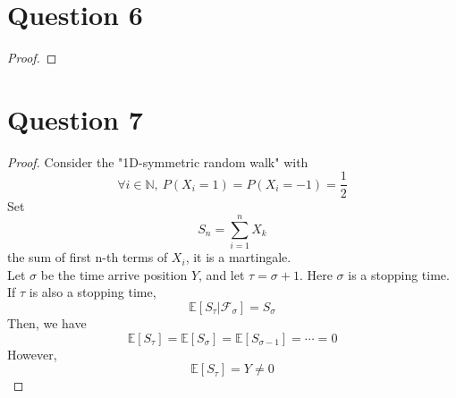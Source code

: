 \documentclass{article}
\begin{document}
\section*{Question 6}
    \begin{proof}

    \end{proof}

\section*{Question 7}
    \begin{proof}
    Consider the "1D-symmetric random walk" with
    $$\forall i\in \mathbb{N},\ P(X_i = 1) = P(X_i = -1) = \frac{1}{2}$$
    Set $$S_n = \sum_{i=1}^n X_k$$the sum of first n-th terms of $X_i$, it is a martingale.\\
    Let $\sigma$ be the time arrive position $Y$, and let $\tau=\sigma+1$. Here $\sigma$ is a stopping time.\\
    If $\tau$ is also a stopping time,
    $$\mathbb{E}[S_\tau|\mathcal{F}_\sigma]=S_\sigma$$
    Then, we have
    $$\mathbb{E}[S_\tau]=\mathbb{E}[S_\sigma]=\mathbb{E}[S_{\sigma-1}]=\cdots=0$$
    However,
    $$\mathbb{E}[S_\tau]=Y\not=0$$

    
    \end{proof}
\end{document}
